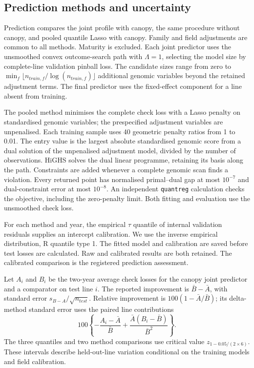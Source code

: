 


\subsection{Prediction methods and uncertainty}

Prediction compares the joint profile with canopy, the same procedure
without canopy, and pooled quantile Lasso with canopy. Family and
field adjustments are common to all methods. Maturity is excluded.
Each joint predictor uses the unsmoothed convex outcome-search path
with $\Lambda=1$, selecting the model size by complete-line validation
pinball loss. The candidate sizes range from zero to
$\min_f\lfloor n_{train,f}/\log(n_{train,f})\rfloor$ additional
genomic variables beyond the retained adjustment terms. The final predictor uses the fixed-effect component for
a line absent from training.

The pooled method minimises the complete check loss with a Lasso
penalty on standardised genomic variables; the prespecified
adjustment variables are unpenalised. Each training sample uses
40 geometric penalty ratios from 1 to 0.01. The entry value is the
largest absolute standardised genomic score from a dual solution of
the unpenalised adjustment model, divided by the number of observations.
HiGHS solves the dual linear programme, retaining its basis along
the path. Constraints are added whenever a complete genomic scan
finds a violation. Every returned point has normalised primal--dual
gap at most $10^{-7}$ and dual-constraint error at most $10^{-8}$.
An independent \texttt{quantreg} calculation checks the objective,
including the zero-penalty limit. Both fitting and evaluation use
the unsmoothed check loss.

For each method and year, the empirical $\tau$ quantile of internal
validation residuals supplies an intercept calibration. We use the
inverse empirical distribution, R quantile type 1. The fitted model
and calibration are saved before test losses are calculated.
Raw and calibrated results are both retained. The calibrated
comparison is the registered prediction assessment.

Let $A_i$ and $B_i$ be the two-year average check losses for the
canopy joint predictor and a comparator on test line $i$. The
reported improvement is $\bar B-\bar A$, with standard error
$s_{B-A}/\sqrt{n_{test}}$. Relative improvement is
$100(1-\bar A/\bar B)$; its delta-method standard error uses the
paired line contributions
\[
 100\left\{-\frac{A_i-\bar A}{\bar B}
 +\frac{\bar A(B_i-\bar B)}{\bar B^2}\right\}.
\]
The three quantiles and two method comparisons use critical value
$z_{1-0.05/(2\times6)}$. These intervals describe held-out-line
variation conditional on the training models and field calibration.






